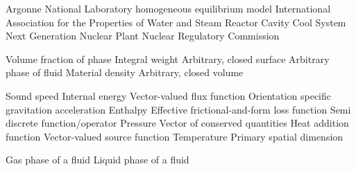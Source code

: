 \begin{Nomenclature}

    \begin{SubNomenclature}[Acronym]
           {Argonne National Laboratory}
           {homogeneous equilibrium model}
         {International Association for the Properties of Water and Steam}
          {Reactor Cavity Cool System}
          {Next Generation Nuclear Plant}
           {Nuclear Regulatory Commission}
    \end{SubNomenclature}
    
    \begin{SubNomenclature}[Greek]
        \Add{$\alpha_\text{\phi}$} {Volume fraction of phase \phi}
        \Add{\beta}  {Integral weight}
        \Add{\Gamma} {Arbitrary, closed surface}
        \Add{\phi}   {Arbitrary phase of fluid}
        \Add{\rho}   {Material density}
        \Add{\Omega} {Arbitrary, closed volume}
    \end{SubNomenclature}
    
    \begin{SubNomenclature}[Latin]
                         {Sound speed}
                         {Internal energy}
        \Add{$\Flux$}             {Vector-valued flux  function}
                 {Orientation specific gravitation acceleration}
                         {Enthalpy}
               {Effective frictional-and-form loss function}
                         {Semi discrete function/operator}
                         {Pressure}
        \Add{\qCon}               {Vector of conserved quantities}
         {Heat addition function}
        \Add{$\Source$}           {Vector-valued source function}
                         {Temperature}
        \Add{$\Space$}            {Primary spatial dimension}
    \end{SubNomenclature}
    
    \begin{SubNomenclature}[Subscripts]
           {Gas phase of a fluid}
        \Add{$\ell$}  {Liquid phase of a fluid}
    \end{SubNomenclature}
    
    
\end{Nomenclature}
